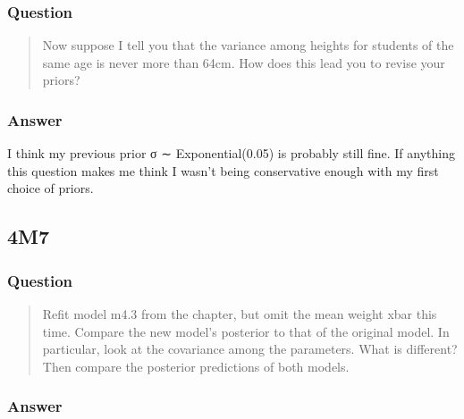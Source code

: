 \documentclass[
]{book}
\begin{document}
\hypertarget{question-43}{%
\subsubsection*{Question}\label{question-43}}

\begin{quote}
Now suppose I tell you that the variance among heights for students of the same age is never more than 64cm. How does this lead you to revise your priors?
\end{quote}

\hypertarget{answer-43}{%
\subsubsection*{Answer}\label{answer-43}}

I think my previous prior σ ∼ Exponential(0.05) is probably still fine. If anything this question makes me think I wasn't being conservative enough with my first choice of priors.

\hypertarget{m7-1}{%
\subsection*{4M7}\label{m7-1}}

\hypertarget{question-44}{%
\subsubsection*{Question}\label{question-44}}

\begin{quote}
Refit model m4.3 from the chapter, but omit the mean weight xbar this time.
Compare the new model's posterior to that of the original model. In particular, look at the covariance among the
parameters. What is different? Then compare the posterior predictions of both models.
\end{quote}

\hypertarget{answer-44}{%
\subsubsection*{Answer}\label{answer-44}}
\end{document}
